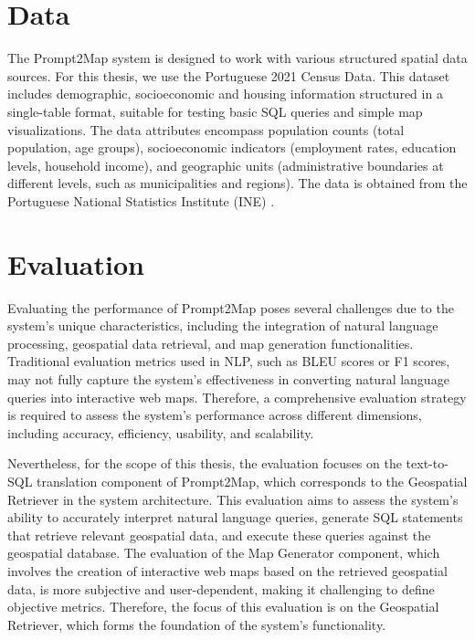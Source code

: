 \section{Data}
The Prompt2Map system is designed to work with various structured spatial data sources. For this thesis, we use the Portuguese 2021 Census Data. This dataset includes demographic, socioeconomic and housing information structured in a single-table format, suitable for testing basic SQL queries and simple map visualizations. The data attributes encompass population counts (total population, age groups), socioeconomic indicators (employment rates, education levels, household income), and geographic units (administrative boundaries at different levels, such as municipalities and regions). The data is obtained from the Portuguese National Statistics Institute (INE) \cite{INE2021Census}.

\section{Evaluation}


Evaluating the performance of Prompt2Map poses several challenges due to the system's unique characteristics, including the integration of natural language processing, geospatial data retrieval, and map generation functionalities. Traditional evaluation metrics used in NLP, such as BLEU scores or F1 scores, may not fully capture the system's effectiveness in converting natural language queries into interactive web maps. Therefore, a comprehensive evaluation strategy is required to assess the system's performance across different dimensions, including accuracy, efficiency, usability, and scalability.


Nevertheless, for the scope of this thesis, the evaluation focuses on the text-to-SQL translation component of Prompt2Map, which corresponds to the Geospatial Retriever in the system architecture. This evaluation aims to assess the system's ability to accurately interpret natural language queries, generate SQL statements that retrieve relevant geospatial data, and execute these queries against the geospatial database. The evaluation of the Map Generator component, which involves the creation of interactive web maps based on the retrieved geospatial data, is more subjective and user-dependent, making it challenging to define objective metrics. Therefore, the focus of this evaluation is on the Geospatial Retriever, which forms the foundation of the system's functionality.

